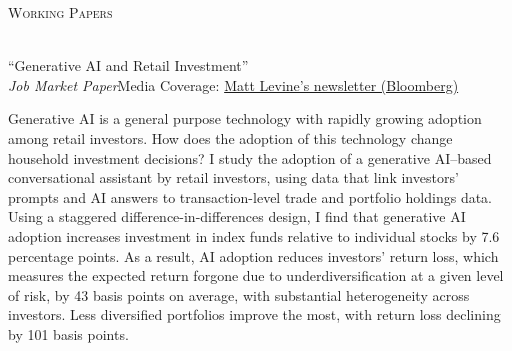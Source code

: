 \documentclass[11pt,a4paper]{article}
\newcommand{\header}[1]{
  {\hspace*{-18pt}\vspace*{6pt}\textsc{#1}}
  \vspace*{-6pt}\lineunder
  \vspace{2mm}
}
\newcommand{\lineunder}{
  \vspace*{-8pt}\\
  \hspace*{-18pt}\hrulefill\\
}
\begin{document}
\header{Working Papers}
``Generative AI and Retail Investment''\\
\textit{Job Market Paper}\hfill Media Coverage: \href{https://www.bloomberg.com/opinion/newsletters/2026-11-12/nvidia-s-board-had-to-do-something?accessToken=eyJhbGciOiJIUzI1NiIsInR5cCI6IkpXVCJ9.eyJzb3VyY2UiOiJTdWJzY3JpYmVyR2lmdGVkQXJ0aWNsZSIsImlhdCI6MTc5NDUyMTgyMSwiZXhwIjoxNzk1MTI2NjIxLCJhcnRpY2xlSWQiOiJUT0VKTkZLSUpIOE8wMCIsImJjb25uZWN0SWQiOiJCOTU4NjJDREE2OTM0OTMwQUFGRUNEMTQzMjAzOENGQyJ9.XtDnNFiE2cEhUvmi8X1HR_zvOXxaCdzlSSG8IkeIL4E}{Matt Levine’s newsletter (Bloomberg)}\\
\vspace{2mm}
{\small
Generative AI is a general purpose technology with rapidly growing adoption among retail investors. How does the adoption of this technology change household investment decisions? I study the adoption of a generative AI--based conversational assistant by retail investors, using data that link investors' prompts and AI answers to transaction-level trade and portfolio holdings data. Using a staggered difference-in-differences design, I find that generative AI adoption increases investment in index funds relative to individual stocks by 7.6 percentage points. As a result, AI adoption reduces investors' return loss, which measures the expected return forgone due to underdiversification at a given level of risk, by 43 basis points on average, with substantial heterogeneity across investors. Less diversified portfolios improve the most, with return loss declining by 101 basis points.\par
}
\vspace{1mm}
\end{document}
